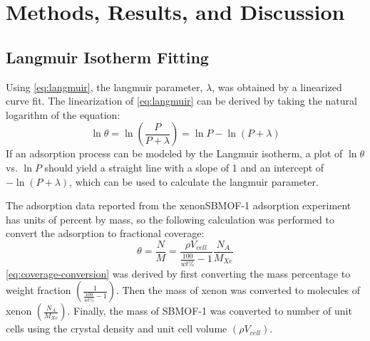 \documentclass{article}
\begin{document}
\section{Methods, Results, and Discussion}
\subsection{Langmuir Isotherm Fitting}
Using \autoref{eq:langmuir}, the langmuir parameter, $\lambda$, was obtained by a linearized curve fit. The linearization of \autoref{eq:langmuir} can be derived by taking the natural logarithm of the equation:
\begin{equation}
    \ln\theta = \ln\left(\frac{P}{P+\lambda}\right) = \ln P - \ln(P + \lambda)
    \label{eq:linear-langmuir}
\end{equation}
If an adsorption process can be modeled by the Langmuir isotherm, a plot of $\ln\theta$ vs. $\ln P$ should yield a straight line with a slope of 1 and an intercept of $-\ln(P+\lambda)$, which can be used to calculate the langmuir parameter.

The adsorption data reported from the xenon\textendash SBMOF-1 adsorption experiment has units of percent by mass, so the following calculation was performed to convert the adsorption to fractional coverage:
\begin{equation}
    \theta = \frac{N}{M} = \frac{\rho V_\textit{cell}}{\frac{100}{wt\%} - 1}\frac{N_A}{M_\textit{Xe}}
    \label{eq:coverage-conversion}
\end{equation}
\autoref{eq:coverage-conversion} was derived by first converting the mass percentage to weight fraction $\left(\frac{1}{\frac{100}{wt\%} - 1}\right)$. Then the mass of xenon was converted to molecules of xenon $\left(\frac{N_A}{M_\textit{Xe}}\right)$. Finally, the mass of SBMOF-1 was converted to number of unit cells using the crystal density and unit cell volume $\left(\rho V_\textit{cell}\right)$.
\end{document}
